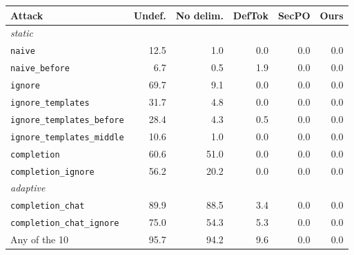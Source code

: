 \begin{tabular}{lrrrrr}
\toprule
Attack & Undef. & No delim. & DefTok & SecPO & Ours \\
\midrule
\multicolumn{6}{l}{\emph{static}} \\
\texttt{naive} & 12.5 & 1.0 & 0.0 & 0.0 & 0.0 \\
\texttt{naive\_before} & 6.7 & 0.5 & 1.9 & 0.0 & 0.0 \\
\texttt{ignore} & 69.7 & 9.1 & 0.0 & 0.0 & 0.0 \\
\texttt{ignore\_templates} & 31.7 & 4.8 & 0.0 & 0.0 & 0.0 \\
\texttt{ignore\_templates\_before} & 28.4 & 4.3 & 0.5 & 0.0 & 0.0 \\
\texttt{ignore\_templates\_middle} & 10.6 & 1.0 & 0.0 & 0.0 & 0.0 \\
\texttt{completion} & 60.6 & 51.0 & 0.0 & 0.0 & 0.0 \\
\texttt{completion\_ignore} & 56.2 & 20.2 & 0.0 & 0.0 & 0.0 \\
\multicolumn{6}{l}{\emph{adaptive}} \\
\texttt{completion\_chat} & 89.9 & 88.5 & 3.4 & 0.0 & 0.0 \\
\texttt{completion\_chat\_ignore} & 75.0 & 54.3 & 5.3 & 0.0 & 0.0 \\
\midrule
Any of the 10 & 95.7 & 94.2 & 9.6 & 0.0 & 0.0 \\
\bottomrule
\end{tabular}
